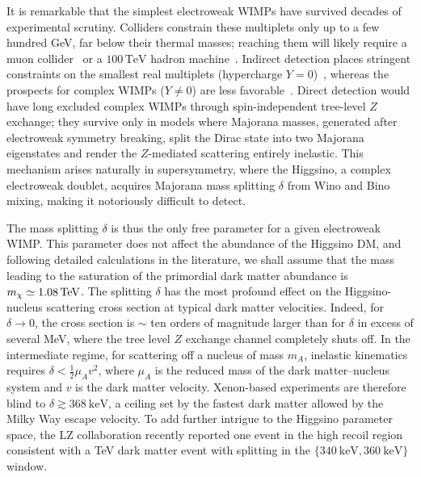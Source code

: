 \documentclass[prl,reprint,superscriptaddress]{revtex4-2}
\begin{document}
It is remarkable that the simplest electroweak WIMPs have survived decades of experimental scrutiny. Colliders constrain these multiplets only up to a few hundred GeV, far below their thermal masses; reaching them will likely require a muon collider~\cite{Han:2020uak,Capdevilla:2021fmj,Bottaro:2022one} or a $100\,\mathrm{TeV}$ hadron machine~\cite{Saito:2019rtg}. Indirect detection places stringent constraints on the smallest real multiplets (hypercharge $Y=0$)~\cite{Baumgart:2025dov,Safdi:2025sfs}, whereas the prospects for complex WIMPs ($Y \neq 0$) are less favorable~\cite{Abe:2025lci}. Direct detection would have long excluded complex WIMPs through spin-independent tree-level $Z$ exchange; they survive only in models where Majorana masses, generated after electroweak symmetry breaking, split the Dirac state into two Majorana eigenstates and render the $Z$-mediated scattering entirely inelastic. This mechanism arises naturally in supersymmetry, where the Higgsino, a complex electroweak doublet, acquires Majorana mass splitting $\delta$ from Wino and Bino mixing, making it notoriously difficult to detect. 


The mass splitting $\delta$ is thus the only free parameter for a given electroweak WIMP. This parameter does not affect the abundance of the Higgsino DM, and following detailed calculations in the literature, we shall assume that the mass leading to the saturation of the primordial dark matter abundance is $m_\chi \simeq 1.08\,\rm TeV$. The splitting $\delta$ has the most profound effect on the Higgsino-nucleus scattering cross section at typical dark matter velocities. Indeed, for $\delta \to 0$, the cross section is $\sim$ ten orders of magnitude larger than for $\delta$ in excess of several MeV, where the tree level $Z$ exchange channel completely shuts off. In the intermediate regime, for scattering off a nucleus of mass $m_A$, inelastic kinematics requires $\delta < \frac{1}{2}\mu_A v^2$, where $\mu_A$ is the reduced mass of the dark matter--nucleus system and $v$ is the dark matter velocity. Xenon-based experiments are therefore blind to $\delta \gtrsim 368~\mathrm{keV}$, a ceiling set by the fastest dark matter allowed by the Milky Way escape velocity. To add further intrigue to the Higgsino parameter space, the LZ collaboration recently reported one event in the high recoil region~\cite{LZ:2026extended} consistent with a TeV dark matter event with splitting in the $\{340~\textrm{keV},360~\textrm{keV}\}$ window.   
\end{document}
